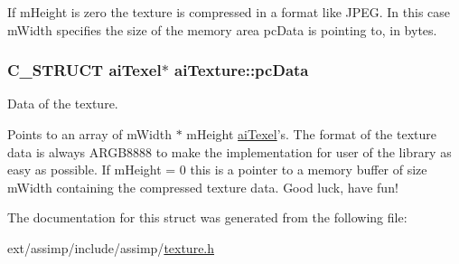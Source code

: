 If m\-Height is zero the texture is compressed in a format like J\-P\-E\-G. In this case m\-Width specifies the size of the memory area pc\-Data is pointing to, in bytes. \hypertarget{structai_texture_aeb07528748b6e49d2d81c60006024f9a}{
\subsubsection[{pc\-Data}]{\setlength{\rightskip}{0pt plus 5cm}C\-\_\-\-S\-T\-R\-U\-C\-T {\bf ai\-Texel}$\ast$ ai\-Texture\-::pc\-Data}}\label{structai_texture_aeb07528748b6e49d2d81c60006024f9a}
Data of the texture.

Points to an array of m\-Width $\ast$ m\-Height \hyperlink{structai_texel}{ai\-Texel}'s. The format of the texture data is always A\-R\-G\-B8888 to make the implementation for user of the library as easy as possible. If m\-Height = 0 this is a pointer to a memory buffer of size m\-Width containing the compressed texture data. Good luck, have fun! 

The documentation for this struct was generated from the following file\-:\begin{DoxyCompactItemize}
\item 
ext/assimp/include/assimp/\hyperlink{texture_8h}{texture.\-h}\end{DoxyCompactItemize}
